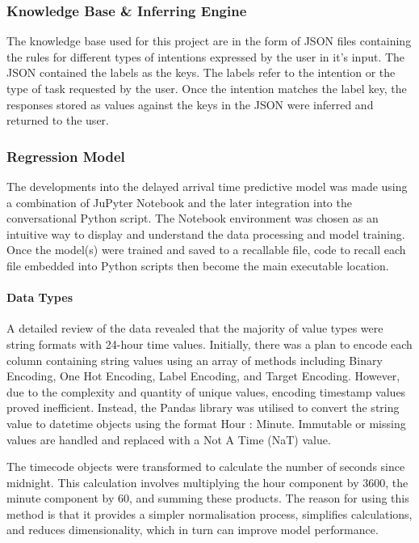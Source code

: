 \subsubsection{Knowledge Base \& Inferring Engine}
The knowledge base used for this project are in the form of JSON files containing the rules for different types of intentions expressed by the user in it's input. The JSON contained the labels as the keys. The labels refer to the intention or the type of task requested by the user. Once the intention matches the label key, the responses stored as values against the keys in the JSON were inferred and returned to the user. 

\subsubsection{Regression Model}
The developments into the delayed arrival time predictive model was made using a combination of JuPyter Notebook and the later integration into the conversational Python script. The Notebook environment was chosen as an intuitive way to display and understand the data processing and model training. Once the model(s) were trained and saved to a recallable file, code to recall each file embedded into Python scripts then become the main executable location.

\paragraph{Data Types}\label{sec: Data Processing}
A detailed review of the data revealed that the majority of value types were string formats with 24-hour time values. Initially, there was a plan to encode each column containing string values using an array of methods including Binary Encoding, One Hot Encoding, Label Encoding, and Target Encoding. However, due to the complexity and quantity of unique values, encoding timestamp values proved inefficient. Instead, the Pandas library was utilised to convert the string value to datetime objects using the format Hour : Minute. Immutable or missing values are handled and replaced with a Not A Time (NaT) value.\vspace{0.5cm}

\noindent
The timecode objects were transformed to calculate the number of seconds since midnight. This calculation involves multiplying the hour component by 3600, the minute component by 60, and summing these products. The reason for using this method is that it provides a simpler normalisation process, simplifies calculations, and reduces dimensionality, which in turn can improve model performance. 

